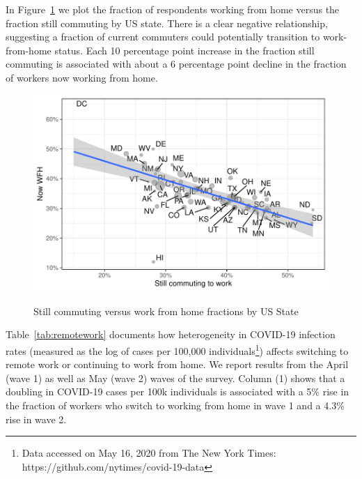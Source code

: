 \documentclass[12pt]{article}
\begin{document}
In Figure~\ref{fig:commute_vs_wfh} we plot the fraction of respondents working from home versus the fraction still commuting by US state.
There is a clear negative relationship, suggesting a fraction of current commuters could potentially transition to work-from-home status.
Each 10 percentage point increase in the fraction still commuting is associated with about a 6 percentage point decline in the fraction of workers now working from home. 

\begin{figure}
  \caption{Still commuting versus work from home fractions by US State} \label{fig:commute_vs_wfh}
\centering
\begin{minipage}{0.8 \linewidth}
  \includegraphics[width = \linewidth]{plots/commute_vs_wfh.pdf} \\
  \begin{footnotesize}
    \end{footnotesize}
\end{minipage}
\end{figure} 

Table~\ref{tab:remotework} documents how heterogeneity in COVID-19 infection rates (measured as the log of cases per 100,000 individuals\footnote{Data accessed on May 16, 2020 from The New York Times: https://github.com/nytimes/covid-19-data}) affects switching to remote work or continuing to work from home. We report results from the April (wave 1) as well as May (wave 2) waves of the survey. Column (1) shows that a doubling in COVID-19 cases per 100k individuals is associated with a 5\% rise in the fraction of workers who switch to working from home in wave 1 and a 4.3\% rise in wave 2. 
\end{document}
